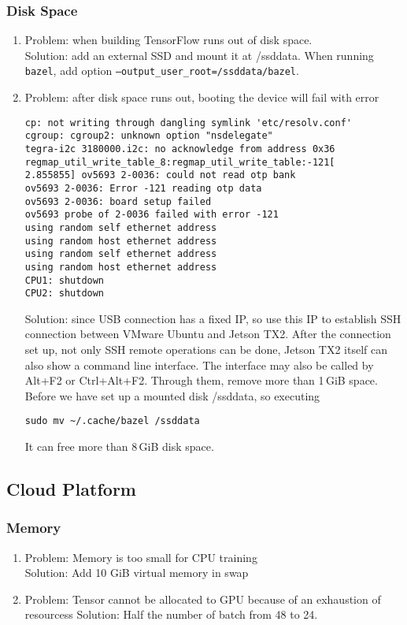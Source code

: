 \documentclass[a4paper]{article}
\begin{document}
\subsubsection{Disk Space}
\begin{enumerate}
    \item Problem: when building TensorFlow runs out of disk space.\\
    Solution: add an external SSD and mount it at /ssddata. When running \texttt{bazel}, add option \texttt{--output\_user\_root=/ssddata/bazel}.
    \item Problem: after disk space runs out, booting the device will fail with error
    \begin{verbatim}
cp: not writing through dangling symlink 'etc/resolv.conf'
cgroup: cgroup2: unknown option "nsdelegate"
tegra-i2c 3180000.i2c: no acknowledge from address 0x36
regmap_util_write_table_8:regmap_util_write_table:-121[    2.855855] ov5693 2-0036: could not read otp bank
ov5693 2-0036: Error -121 reading otp data
ov5693 2-0036: board setup failed
ov5693 probe of 2-0036 failed with error -121
using random self ethernet address
using random host ethernet address
using random self ethernet address
using random host ethernet address
CPU1: shutdown
CPU2: shutdown
    \end{verbatim}
    Solution: since USB connection has a fixed IP, so use this IP to establish SSH connection between VMware Ubuntu and Jetson TX2. After the connection set up, not only SSH remote operations can be done, Jetson TX2 itself can also show a command line interface. The interface may also be called by Alt+F2 or Ctrl+Alt+F2. Through them, remove more than 1\,GiB space. Before we have set up a mounted disk /ssddata, so executing
    \begin{verbatim}
sudo mv ~/.cache/bazel /ssddata
    \end{verbatim}
    It can free more than 8\,GiB disk space.
\end{enumerate}

\subsection{Cloud Platform}
\subsubsection{Memory}
\begin{enumerate}
    \item Problem: Memory is too small for CPU training \\
    Solution: Add 10 GiB virtual memory in swap
    \item Problem: Tensor cannot be allocated to GPU because of an exhaustion of resourcess
    Solution: Half the number of batch from 48 to 24.
\end{enumerate}
\end{document}
